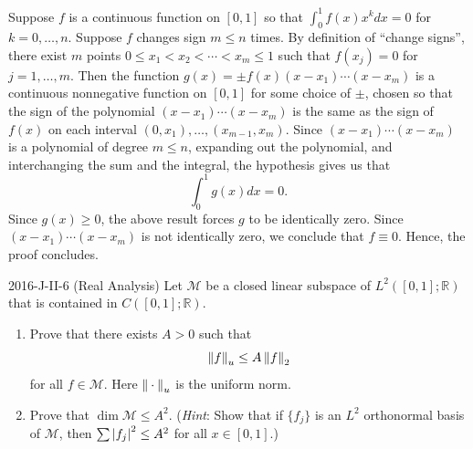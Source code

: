 \documentclass{article}
\begin{document}
\begin{solutions}
	Suppose $f$ is a continuous function on $[0,1]$ so that $\int_{0}^{1}f(x)x^{k}dx = 0$ for $k =0, \ldots, n$. Suppose $f$ changes sign $m \leq n$ times. By definition of ``change signs'', there exist $m$ points $0 \leq x_{1} < x_{2} < \dotsm < x_{m} \leq 1$ such that $f(x_{j}) = 0$ for $j = 1, \ldots, m$. Then the function $g(x) = \pm f(x)(x - x_{1})\dotsm (x - x_{m})$ is a continuous nonnegative function on $[0,1]$ for some choice of $\pm$, chosen so that the sign of the polynomial $(x - x_{1})\dotsm(x - x_{m})$ is the same as the sign of $f(x)$ on each interval $(0,x_{1}), \ldots, (x_{m - 1}, x_{m})$. Since $(x - x_{1}) \dotsm (x - x_{m})$ is a polynomial of degree $m \leq n$, expanding out the polynomial, and interchanging the sum and the integral, the hypothesis gives us that 
		\begin{equation}
			\int_{0}^{1}g(x)dx = 0. 
		\end{equation}
	Since $g(x) \geq 0$, the above result forces $g$ to be identically zero. Since $(x - x_{1})\dotsm (x - x_{m})$ is not identically zero, we conclude that $f \equiv 0$. Hence, the proof concludes. 
\end{solutions}
\begin{prb}{2016-J-II-6 (Real Analysis)}
	Let $\mathscr{M}$ be a closed linear subspace of $L^{2}([0,1]; \mathbb{R})$ that is contained in $C([0,1]; \mathbb{R})$. \vspace{-0.35cm}
	\begin{enumerate}[itemsep =-2pt,label = (\alph{*})]
		\item Prove that there exists $A > 0$ such that 
			\begin{equation*}
				\left\Vert f \right\Vert_{u} \leq A\left\Vert f \right\Vert_{2}
			\end{equation*}
		for all $f \in \mathscr{M}$. Here $\left\Vert \hspace{2pt}\cdot\hspace{2pt} \right\Vert_{u}$ is the uniform norm. 
		\item Prove that $\dim{\mathscr{M}} \leq A^{2}$. (\textit{Hint}: Show that if $\{f_{j}\}$ is an $L^{2}$ orthonormal basis of $\mathscr{M}$, then $\sum \left| f_{j} \right|^{2} \leq A^{2}$ for all $x \in [0,1]$.)
	\end{enumerate}
\end{prb}
\end{document}
